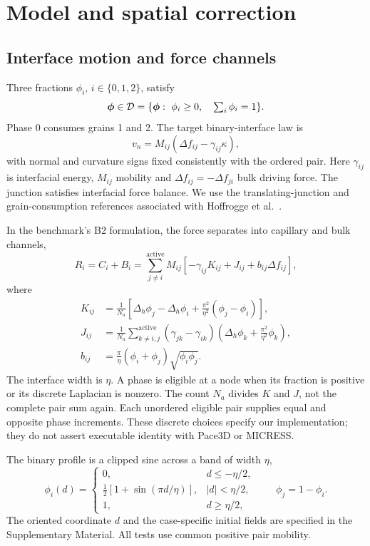 \section{Model and spatial correction}
\subsection{Interface motion and force channels}
Three fractions $\phi_i$, $i\in\{0,1,2\}$, satisfy
\begin{equation}
 \ph\in\mathcal D=\{\ph:\ \phi_i\geq0,\quad \textstyle\sum_i\phi_i=1\}.
 \label{eq:simplex}
\end{equation}
Phase 0 consumes grains 1 and 2. The target binary-interface law is
\begin{equation}
 v_n=M_{ij}(\Delta f_{ij}-\gamma_{ij}\kappa),
 \label{eq:sharp}
\end{equation}
with normal and curvature signs fixed consistently with the ordered pair. Here $\gamma_{ij}$ is interfacial energy, $M_{ij}$ mobility and $\Delta f_{ij}=-\Delta f_{ji}$ bulk driving force. The junction satisfies interfacial force balance. We use the translating-junction and grain-consumption references associated with Hoffrogge et al.\ \citep{hoffrogge2025}.

In the benchmark's B2 formulation, the force separates into capillary and bulk channels,
\begin{equation}
 R_i=C_i+B_i
 =\sum_{j\ne i}^{\mathrm{active}}M_{ij}
 [-\gamma_{ij}K_{ij}+J_{ij}+b_{ij}\Delta f_{ij}],
 \label{eq:b2}
\end{equation}
where
\begin{align}
 K_{ij}&=\frac{1}{N_a}\left[\Delta_h\phi_j-\Delta_h\phi_i+
 \frac{\pi^2}{\eta^2}(\phi_j-\phi_i)\right],\label{eq:K}\\
 J_{ij}&=\frac{1}{N_a}\sum_{k\ne i,j}^{\mathrm{active}}
 (\gamma_{jk}-\gamma_{ik})
 \left(\Delta_h\phi_k+\frac{\pi^2}{\eta^2}\phi_k\right),\label{eq:J}\\
 b_{ij}&=\frac{\pi}{\eta}(\phi_i+\phi_j)\sqrt{\phi_i\phi_j}.
 \label{eq:b}
\end{align}
The interface width is $\eta$. A phase is eligible at a node when its fraction is positive or its discrete Laplacian is nonzero. The count $N_a$ divides $K$ and $J$, not the complete pair sum again. Each unordered eligible pair supplies equal and opposite phase increments. These discrete choices specify our implementation; they do not assert executable identity with Pace3D or MICRESS.

The binary profile is a clipped sine across a band of width $\eta$,
\begin{equation}
 \phi_i(d)=
 \begin{cases}
 0,&d\leq-\eta/2,\\
 \tfrac12[1+\sin(\pi d/\eta)],&|d|<\eta/2,\\
 1,&d\geq\eta/2 ,
 \end{cases}
 \qquad\phi_j=1-\phi_i .
 \label{eq:profile}
\end{equation}
The oriented coordinate $d$ and the case-specific initial fields are specified in the Supplementary Material. All tests use common positive pair mobility.

